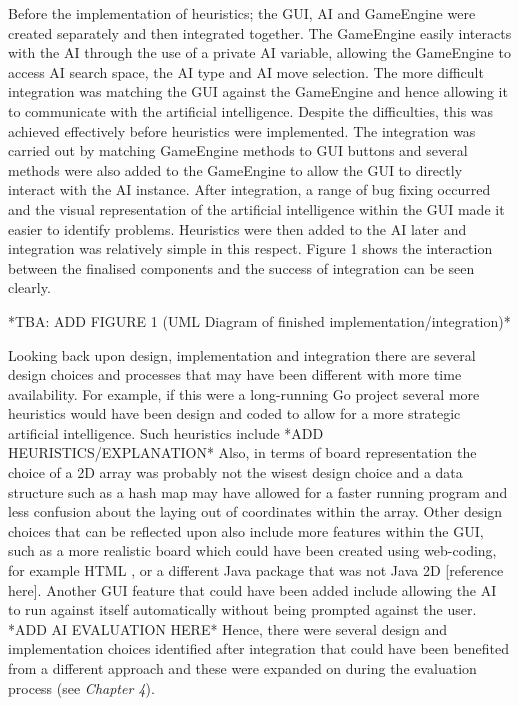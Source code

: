 \documentclass{l3proj}
\begin{document}
Before the implementation of heuristics; the GUI, AI and GameEngine were created separately and then integrated together. The GameEngine easily interacts with the AI through the use of a private AI variable, allowing the GameEngine to access AI search space, the AI type and AI move selection. The more difficult integration was matching the GUI against the GameEngine and hence allowing it to communicate with the artificial intelligence. Despite the difficulties, this was achieved effectively before heuristics were implemented. The integration was carried out by matching GameEngine methods to GUI buttons and several methods were also added to the GameEngine to allow the GUI to directly interact with the AI instance. After integration, a range of bug fixing occurred and the visual representation of the artificial intelligence within the GUI made it easier to identify problems. Heuristics were then added to the AI later and integration was relatively simple in this respect. Figure 1 shows the interaction between the finalised components and the success of integration can be seen clearly.

*TBA: ADD FIGURE 1 (UML Diagram of finished implementation/integration)*

Looking back upon design, implementation and integration there are several design choices and processes that may have been different with more time availability. For example, if this were a long-running Go project several more heuristics would have been design and coded to allow for a more strategic artificial intelligence. Such heuristics include *ADD HEURISTICS/EXPLANATION* Also, in terms of board representation the choice of a 2D array was probably not the wisest design choice and a data structure such as a hash map may have allowed for a faster running program and less confusion about the laying out of coordinates within the array. Other design choices that can be reflected upon also include more features within the GUI, such as a more realistic board which could have been created using web-coding, for example HTML \cite{HTMLRef}, or a different Java package that was not Java 2D [reference here]. Another GUI feature that could have been added include allowing the AI to run against itself automatically without being prompted against the user. *ADD AI EVALUATION HERE* Hence, there were several design and implementation choices identified after integration that could have been benefited from a different approach and these were expanded on during the evaluation process (see \textit{Chapter 4}).
\end{document}
